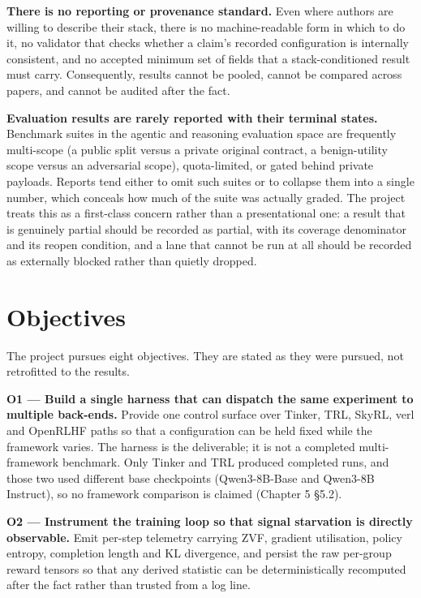 \documentclass[12pt,a4paper]{report}
\begin{document}
\textbf{There is no reporting or provenance standard.} Even where
authors are willing to describe their stack, there is no
machine-readable form in which to do it, no validator that checks
whether a claim's recorded configuration is internally consistent, and
no accepted minimum set of fields that a stack-conditioned result must
carry. Consequently, results cannot be pooled, cannot be compared across
papers, and cannot be audited after the fact.

\textbf{Evaluation results are rarely reported with their terminal
states.} Benchmark suites in the agentic and reasoning evaluation space
are frequently multi-scope (a public split versus a private original
contract, a benign-utility scope versus an adversarial scope),
quota-limited, or gated behind private payloads. Reports tend either to
omit such suites or to collapse them into a single number, which
conceals how much of the suite was actually graded. The project treats
this as a first-class concern rather than a presentational one: a result
that is genuinely partial should be recorded as partial, with its
coverage denominator and its reopen condition, and a lane that cannot be
run at all should be recorded as externally blocked rather than quietly
dropped.

\section{Objectives}\label{objectives}

The project pursues eight objectives. They are stated as they were
pursued, not retrofitted to the results.

\textbf{O1 --- Build a single harness that can dispatch the same
experiment to multiple back-ends.} Provide one control surface over
Tinker, TRL, SkyRL, verl and OpenRLHF paths so that a configuration can
be held fixed while the framework varies. The harness is the
deliverable; it is not a completed multi-framework benchmark. Only
Tinker and TRL produced completed runs, and those two used different
base checkpoints (Qwen3-8B-Base and Qwen3-8B Instruct), so no framework
comparison is claimed (Chapter 5 §5.2).

\textbf{O2 --- Instrument the training loop so that signal starvation is
directly observable.} Emit per-step telemetry carrying ZVF, gradient
utilisation, policy entropy, completion length and KL divergence, and
persist the raw per-group reward tensors so that any derived statistic
can be deterministically recomputed after the fact rather than trusted
from a log line.
\end{document}
